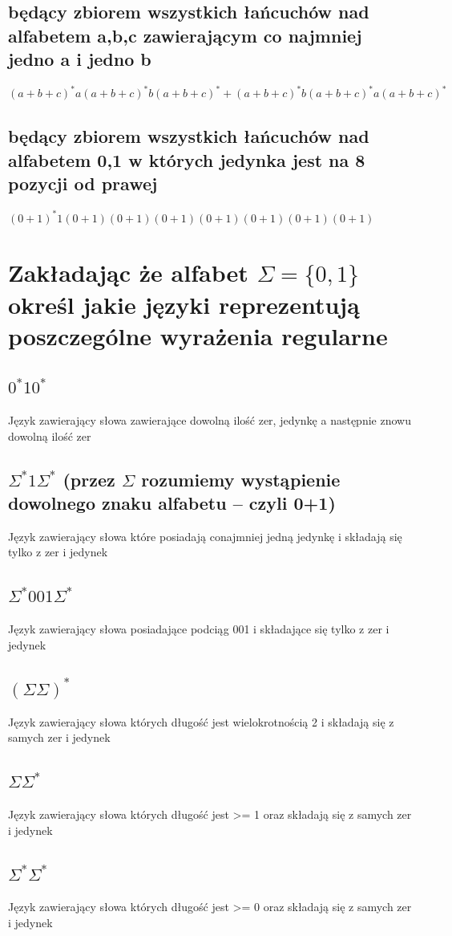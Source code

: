 \documentclass[a4paper,11pt]{article}
\begin{document}
\subsection{będący zbiorem wszystkich łańcuchów nad alfabetem {a,b,c} zawierającym co najmniej jedno a i jedno b}
$(a+b+c)^*a(a+b+c)^*b(a+b+c)^* + (a+b+c)^*b(a+b+c)^*a(a+b+c)^*$
\subsection{będący zbiorem wszystkich łańcuchów nad alfabetem {0,1} w których jedynka jest na 8 pozycji od prawej}
$(0+1)^*1(0+1)(0+1)(0+1)(0+1)(0+1)(0+1)(0+1)$

\newpage
\section{Zakładając że alfabet $\Sigma = \{0,1\}$ określ jakie języki reprezentują poszczególne wyrażenia regularne}
\subsection{$0^*10^*$}
Język zawierający słowa zawierające dowolną ilość zer,  jedynkę a następnie znowu dowolną ilość zer
\subsection{$\Sigma^*1 \Sigma^*$ (przez $\Sigma$ rozumiemy wystąpienie dowolnego znaku alfabetu – czyli 0+1)}
Język zawierający słowa które posiadają conajmniej jedną jedynkę i składają się tylko z zer i jedynek
\subsection{$\Sigma^*001 \Sigma ^*$}
Język zawierający słowa posiadające podciąg 001 i składające się tylko z zer i jedynek
\subsection{$(\Sigma \Sigma)^*$}
Język zawierający słowa których długość jest wielokrotnością 2 i składają się z samych zer i jedynek
\subsection{$\Sigma \Sigma ^*$}
Język zawierający słowa których długość jest  >= 1  oraz składają się z samych zer i jedynek
\subsection{$\Sigma ^* \Sigma ^*$}
Język zawierający słowa których długość jest  >= 0 oraz składają się z samych zer i jedynek
\end{document}
